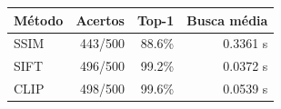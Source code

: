 \begin{tabular}{lrrr}
\toprule
\textbf{Método} & \textbf{Acertos} & \textbf{Top-1} & \textbf{Busca média} \\
\midrule
SSIM & 443/500 & 88.6\% & 0.3361 s \\
SIFT & 496/500 & 99.2\% & 0.0372 s \\
CLIP & 498/500 & 99.6\% & 0.0539 s \\
\bottomrule
\end{tabular}
